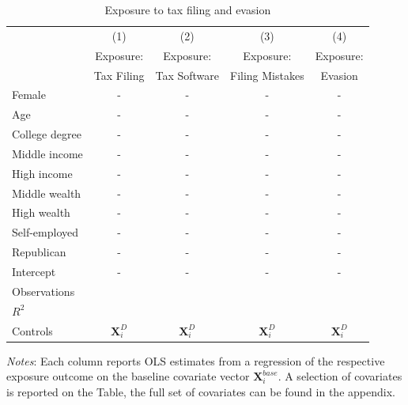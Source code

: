 \documentclass[11pt]{article}
\begin{document}
\begin{table}[!htbp]\centering
\caption{Exposure to tax filing and evasion}
\label{tab:exposure}
\begin{threeparttable}
\begin{tabular}{lcccc}
\toprule
 & (1) & (2) & (3) & (4) \\
 & Exposure: & Exposure: & Exposure: & Exposure: \\
 & Tax Filing & Tax Software & Filing Mistakes & Evasion \\
\midrule
Female                     &-& - & - &-  \\
Age                        &-& - & - &-  \\
College degree             &-& - & - &-  \\
Middle income              &-& - & - &-  \\
High income                &-& - & - &-  \\
Middle wealth              &-& - & - &-  \\
High wealth                &-& - & - &-  \\
Self-employed              &-& - & - &-  \\
Republican                 &-& - & - &-  \\[0.5em]
Intercept              &   -& -   & -  &   -\\
\midrule
Observations               &        &        &        &        \\
$R^2$                      &        &        &        &        \\
Controls                   &$\mathbf{X}_{i}^D$&$\mathbf{X}_{i}^D$&$\mathbf{X}_{i}^D$&$\mathbf{X}_{i}^D$\\
\bottomrule
\end{tabular}
\begin{tablenotes}[flushleft]
\footnotesize
\item \textit{Notes}: Each column reports OLS estimates from a regression of the respective exposure outcome on the baseline covariate vector $\mathbf{X}_i^{base}$. A selection of covariates is reported on the Table, the full set of covariates can be found in the appendix. 
\end{tablenotes}
\end{threeparttable}
\end{table}
\end{document}
